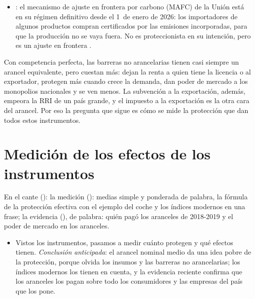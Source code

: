 \documentclass[11pt]{article}
\begin{document}
\begin{itemize}
\item {}: el mecanismo de ajuste en frontera por carbono (MAFC) de la Unión está en su régimen definitivo desde el 1~de enero de 2026: los importadores de algunos productos compran certificados por las emisiones incorporadas, para que la producción no se vaya fuera\nocite{CE2026CBAM}. No es proteccionista en su intención, pero es un ajuste en frontera .
\end{itemize}

\begin{ideaclave}
Con competencia perfecta, las barreras no arancelarias tienen casi siempre un arancel equivalente, pero cuestan más: dejan la renta a quien tiene la licencia o al exportador, protegen más cuando crece la demanda, dan poder de mercado a los monopolios nacionales y se ven menos. La subvención a la exportación, además, empeora la RRI de un país grande, y el impuesto a la exportación es la otra cara del arancel. Por eso la pregunta que sigue es cómo se mide la protección que dan todos estos instrumentos.
\end{ideaclave}

\section{Medición de los efectos de los instrumentos}\label{sec:medicion}

\begin{notaopositor}
En el cante (): la medición (): medias simple y ponderada de palabra, la fórmula de la protección efectiva con el ejemplo del coche y los índices modernos en una frase; la evidencia (), de palabra: quién pagó los aranceles de 2018-2019 y el poder de mercado en los aranceles.
\end{notaopositor}

\begin{itemize}
\item Vistos los instrumentos, pasamos a medir cuánto protegen y qué efectos tienen. \emph{Conclusión anticipada}: el arancel nominal medio da una idea pobre de la protección, porque olvida los insumos y las barreras no arancelarias; los índices modernos los tienen en cuenta, y la evidencia reciente confirma que los aranceles los pagan sobre todo los consumidores y las empresas del país que los pone.
\end{itemize}
\end{document}

